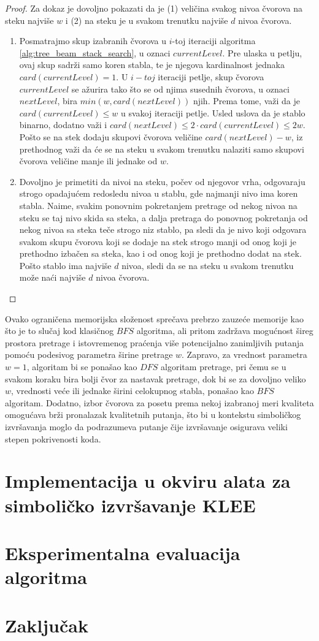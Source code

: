 \documentclass[a4paper]{article}
\begin{document}
\begin{proof}
Za dokaz je dovoljno pokazati da je (1) veličina svakog nivoa čvorova na steku najviše $w$ i (2) na steku je u svakom trenutku najviše $d$ nivoa čvorova.
\begin{enumerate}
    \item Posmatrajmo skup izabranih čvorova u $i$-toj iteraciji algoritma \ref{alg:tree_beam_stack_search}, u oznaci $currentLevel$. Pre ulaska u petlju, ovaj skup sadrži samo koren stabla, te je njegova kardinalnost jednaka $card(currentLevel) = 1$. U $i-toj$ iteraciji petlje, skup čvorova $currentLevel$ se ažurira tako što se od njima susednih čvorova, u oznaci $nextLevel$, bira $min(w, card(nextLevel))$ njih. Prema tome, važi da je $card(currentLevel) \leq w$ u svakoj iteraciji petlje. Usled uslova da je stablo binarno, dodatno važi i $card(nextLevel) \leq 2 \cdot card(currentLevel) \leq 2w$. Pošto se na stek dodaju skupovi čvorova veličine $card(nextLevel) - w$, iz prethodnog važi da će se na steku u svakom trenutku nalaziti samo skupovi čvorova veličine manje ili jednake od $w$.

    \item Dovoljno je primetiti da nivoi na steku, počev od njegovor vrha, odgovaraju strogo opadajućem redosledu nivoa u stablu, gde najmanji nivo ima koren stabla. Naime, svakim ponovnim pokretanjem pretrage od nekog nivoa na steku se taj nivo skida sa steka, a dalja pretraga do ponovnog pokretanja od nekog nivoa sa steka teče strogo niz stablo, pa sledi da je nivo koji odgovara svakom skupu čvorova koji se dodaje na stek strogo manji od onog koji je prethodno izbačen sa steka, kao i od onog koji je prethodno dodat na stek. Pošto stablo ima najviše $d$ nivoa, sledi da se na steku u svakom trenutku može naći najviše $d$ nivoa čvorova.
\end{enumerate}
\end{proof}

Ovako ograničena memorijska složenost sprečava prebrzo zauzeće memorije kao što je to slučaj kod klasičnog $BFS$ algoritma, ali pritom zadržava mogućnost šireg prostora pretrage i istovremenog praćenja više potencijalno zanimljivih putanja pomoću podesivog parametra širine pretrage $w$. Zapravo, za vrednost parametra $w = 1$, algoritam bi se ponašao kao $DFS$ algoritam pretrage, pri čemu se u svakom koraku bira bolji čvor za nastavak pretrage, dok bi se za dovoljno veliko $w$, vrednosti veće ili jednake širini celokupnog stabla, ponašao kao $BFS$ algoritam. Dodatno, izbor čvorova za posetu prema nekoj izabranoj meri kvaliteta omogućava brži pronalazak kvalitetnih putanja, što bi u kontekstu simboličkog izvršavanja moglo da podrazumeva putanje čije izvršavanje osigurava veliki stepen pokrivenosti koda.

\section{Implementacija u okviru alata za simboličko izvršavanje KLEE}

\section{Eksperimentalna evaluacija algoritma}

\section{Zaključak}

\appendix


\end{document}
